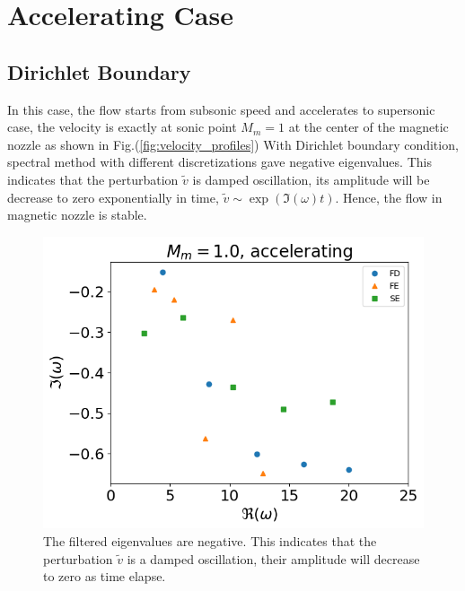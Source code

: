 \section{Accelerating Case}
\subsection{Dirichlet Boundary}
In this case, the flow starts from subsonic speed and accelerates to supersonic case, the velocity is exactly at sonic point $M_m=1$ at the center of the magnetic nozzle as shown in Fig.(\ref{fig:velocity_profiles})
With Dirichlet boundary condition, spectral method with different discretizations gave negative eigenvalues. This indicates that the perturbation $\tilde{v}$ is damped oscillation, its amplitude will be decrease to zero exponentially in time, $\tilde{v} \sim \exp(\Im(\omega)t)$. Hence, the flow in magnetic nozzle is stable.
\begin{figure} [H]
	\centering
	\includegraphics[width=0.7\linewidth]{img/numerical_experiments/fixed_fixed/accelerating_v}
	\caption{The filtered eigenvalues are negative. This indicates that the perturbation $\tilde{v}$ is a damped oscillation, their amplitude will decrease to zero as time elapse.}
	\label{fig:accelerating_v_dirichlet}
\end{figure}

